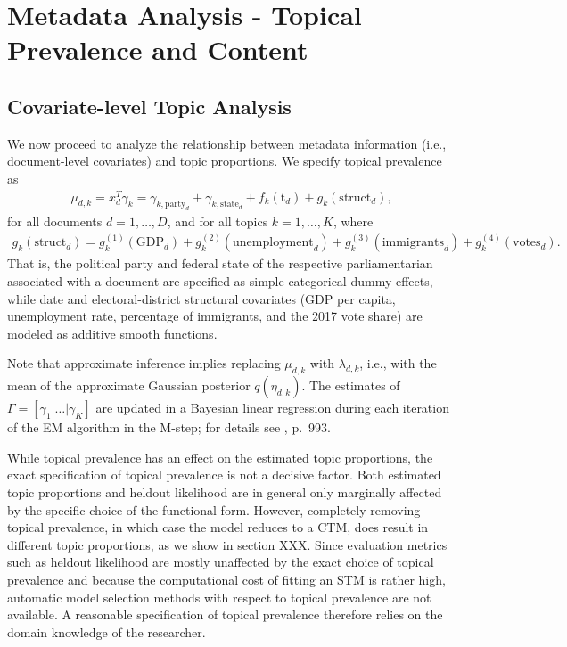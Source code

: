 \section{Metadata Analysis - Topical Prevalence and Content}

\subsection{Covariate-level Topic Analysis}

We now proceed to analyze the relationship between metadata information (i.e., document-level covariates) and topic proportions. We specify topical prevalence as 
\begin{align}
\mu_{d,k} = x_d^T \gamma_k= \gamma_{k,\text{party}_d} + \gamma_{k,\text{state}_d} + f_k(\text{t}_d) + g_k(\text{struct}_d), \label{prevalence}
\end{align} 
for all documents $d = 1,\dots,D$, and for all topics $k = 1,\dots,K$, where 
\begin{align*}
g_k(\text{struct}_d) = g_{k}^{(1)}(\text{GDP}_d)+g_{k}^{(2)}(\text{unemployment}_d)+g_{k}^{(3)}(\text{immigrants}_d)+g_{k}^{(4)}(\text{votes}_d). 
\end{align*} 
That is, the political party and federal state of the respective parliamentarian associated with a document are specified as simple categorical dummy effects, while date and electoral-district structural covariates (GDP per capita, unemployment rate, percentage of immigrants, and the 2017 vote share) are modeled as additive smooth functions.

Note that approximate inference implies replacing $\mu_{d,k}$ with $\lambda_{d,k}$, i.e., with the mean of the approximate Gaussian posterior $q(\eta_{d,k})$. The estimates of $\Gamma = [\gamma_1 | \dots | \gamma_K]$ are updated in a Bayesian linear regression during each iteration of the EM algorithm in the M-step; for details see \cite{roberts2013structural}, p.\ 993.

While topical prevalence has an effect on the estimated topic proportions, the exact specification of topical prevalence is not a decisive factor. Both estimated topic proportions and heldout likelihood are in general only marginally affected by the specific choice of the functional form. However, completely removing topical prevalence, in which case the model reduces to a CTM, does result in different topic proportions, as we show in section XXX. Since evaluation metrics such as heldout likelihood are mostly unaffected by the exact choice of topical prevalence and because the computational cost of fitting an STM is rather high, automatic model selection methods with respect to topical prevalence are not available. A reasonable specification of topical prevalence therefore relies on the domain knowledge of the researcher.


